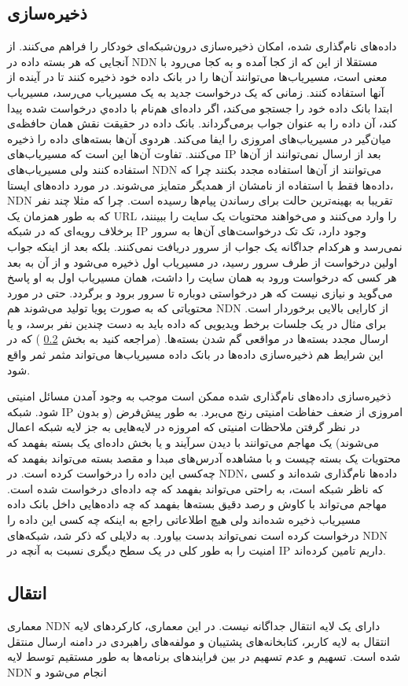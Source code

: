 \subsection{ذخیره‌سازی}
داده‌های نام‌گذاری شده، امکان ذخیره‌سازی درون‌شبکه‌ای خودکار را فراهم‌ می‌کنند. از آنجایی که هر بسته داده در NDN مستقلا از این که از کجا آمده و به کجا می‌رود با معنی است، مسیریاب‌ها می‌توانند آن‌ها را در بانک داده خود ذخیره کنند تا در آینده از آنها استفاده کنند. زمانی که یک درخواست جدید به یک مسیریاب می‌رسد، مسیریاب ابتدا بانک داده خود را جستجو می‌کند، اگر داده‌ای هم‌نام با داده‌ي درخواست شده پیدا کند، آن داده را به عنوان جواب برمی‌گرداند. بانک داده در حقیقت نقش همان حافظه‌‌ی میان‌گیر در مسیریاب‌های امروزی را ایفا می‌کند. هردوی آن‌ها بسته‌‌های داده را ذخیره‌ می‌کنند. تفاوت آن‌ها این است که مسیریاب‌‌های IP بعد از ارسال نمی‌توانند از آن‌ها استفاده کنند ولی مسیریاب‌های NDN  می‌توانند از آن‌ها استفاده مجدد بکنند چرا که داده‌‌ها فقط با استفاده از نامشان از همدیگر متمایز می‌شوند. در مورد داده‌های ایستا، NDN تقریبا به بهینه‌ترین حالت برای رساندن پیام‌ها رسیده است. چرا که مثلا چند نفر که به طور همزمان یک URL را وارد می‌کنند و می‌خواهند محتویات یک سایت را ببینند، برخلاف رویه‌ای که در شبکه IP وجود دارد، تک تک درخواست‌های آن‌ها به سرور نمی‌رسد و هرکدام جداگانه یک جواب از سرور دریافت نمی‌کنند. بلکه بعد از اینکه جواب اولین درخواست از طرف سرور رسید، در مسیریاب اول ذخیره می‌شود و از آن به بعد هر کسی که درخواست ورود به همان سایت را داشت، همان مسیریاب اول به او پاسخ می‌گوید و نیازی نیست که هر درخواستی دوباره تا سرور برود و برگردد. حتی در مورد محتویاتی که به صورت پویا تولید می‌شوند هم NDN از کارایی بالایی برخوردار است. برای مثال در یک جلسات برخط ویدیویی که داده باید به دست چندین نفر برسد، و یا ارسال مجدد بسته‌ها در مواقعی گم شدن بسته‌ها. (مراجعه کنید به بخش 
\ref{section:enteghal}
) که در این شرایط هم ذخیره‌سازی داده‌ها در بانک داده مسیریاب‌ها می‌تواند مثمر ثمر واقع شود. 

ذخیره‌سازی داده‌های نام‌گذاری شده ممکن است موجب به وجود آمدن مسائل امنیتی شود. شبکه IP امروزی از ضعف حفاظت امنیتی رنج می‌برد. به طور پیش‌فرض (و بدون در نظر گرفتن ملاحظات امنیتی که امروزه در لایه‌هایی به جز لایه شبکه اعمال می‌شوند) یک مهاجم می‌توانند با دیدن سرآیند و یا بخش داده‌ای یک بسته بفهمد که محتویات یک بسته چیست و با مشاهده آدرس‌های مبدا و مقصد بسته می‌تواند بفهمد که چه‌کسی این داده را درخواست کرده است. در NDN، داده‌ها نام‌گذاری شده‌اند و کسی که  ناظر شبکه است، به راحتی می‌تواند بفهمد که چه داده‌ای درخواست شده است. مهاجم می‌تواند با کاوش و رصد دقیق بسته‌ها بفهمد که چه داده‌هایی داخل بانک داده مسیریاب ذخیره شده‌اند ولی هیچ اطلاعاتی راجع به اینکه چه کسی این داده را درخواست کرده است نمی‌تواند بدست بیاورد. به دلایلی که ذکر شد، شبکه‌های NDN امنیت را به طور کلی در یک سطح دیگری نسبت به آنچه در IP  داریم تامین کرده‌اند. 


\subsection{انتقال}
\label{section:enteghal}
معماری NDN  دارای یک لایه انتقال جداگانه نیست. در این معماری، کارکردهای لایه انتقال به لایه کاربر، کتابخانه‌های پشتیبان و مولفه‌‌های راهبردی در دامنه ارسال منتقل شده است. تسهیم و عدم تسهیم در بین فرایندهای برنامه‌ها به طور مستقیم توسط لایه NDN انجام می‌شود و 
